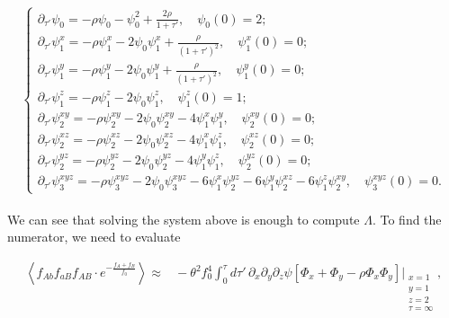 \documentclass[11pt]{article}
\begin{document}
\begin{equation}\label{eq:ode_system_neutral}
    \begin{cases}
    \partial_{\tau'} \psi_0 = -\rho \psi_0 - \psi_0^2 + \frac{2\rho}{1+\tau'}, \quad \psi_0(0) = 2; \\
    
    \partial_{\tau'} \psi_1^x = -\rho \psi_1^x -2 \psi_0 \psi_1^x + \frac{\rho}{(1+\tau')^2}, \quad \psi_1^x(0) = 0; \\
    
    \partial_{\tau'} \psi_1^y = -\rho \psi_1^y -2 \psi_0 \psi_1^y + \frac{\rho}{(1+\tau')^2}, \quad \psi_1^y(0) = 0; \\
    
    \partial_{\tau'} \psi_1^z = -\rho \psi_1^z - 2 \psi_0 \psi_1^z, \quad \psi_1^z(0) = 1; \\
    
    \partial_{\tau'} \psi_2^{xy} = -\rho \psi_2^{xy} - 2 \psi_0 \psi_2^{xy} - 4 \psi_1^x \psi_1^y, \quad \psi_2^{xy}(0) = 0; \\
    
    \partial_{\tau'} \psi_2^{xz} = -\rho \psi_2^{xz} - 2 \psi_0 \psi_2^{xz} - 4 \psi_1^x \psi_1^z, \quad \psi_2^{xz}(0) = 0; \\
    
    \partial_{\tau'} \psi_2^{yz} = -\rho \psi_2^{yz} - 2 \psi_0 \psi_2^{yz} - 4 \psi_1^y \psi_1^z, \quad \psi_2^{yz}(0) = 0; \\
    
    \partial_{\tau'} \psi_3^{xyz} = -\rho \psi_3^{xyz} - 2 \psi_0 \psi_3^{xyz} - 6 \psi_1^x \psi_2^{yz} - 6 \psi_1^y \psi_2^{xz} - 6 \psi_1^z \psi_2^{xy}, \quad \psi_3^{xyz}(0) = 0. 
    \end{cases}
\end{equation}\\


We can see that solving the system above is enough to compute $\Lambda$. To find the numerator, we need to evaluate 

\begin{align}\label{eq:num_lambda_unperturbed}
    \left\langle f_{Ab}f_{aB}f_{AB}\cdot e^{-\frac{f_{A}+f_{B}}{f_0}}\right\rangle \approx&{} 
    -\theta^2 f_0^4 \int_0^{\tau} d\tau'\, \partial_x\partial_y\partial_z \psi \left[\Phi_x + \Phi_y -\rho \Phi_x\Phi_y\right]\Bigg\vert_{\substack{x=1 \\ y=1 \\ z=2 \\ \tau=\infty}},
\end{align}
\end{document}
